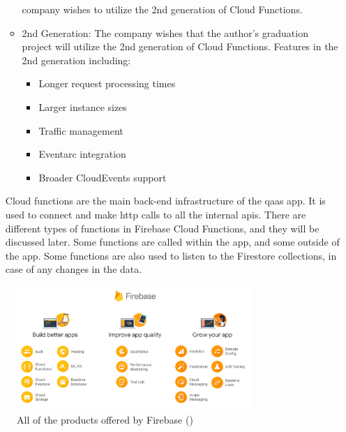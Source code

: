 \begin{itemize}
\begin{itemize}
                        company wishes to utilize the 2nd generation of Cloud Functions.
                  \item 2nd Generation: The company wishes that the author's graduation project will utilize the 2nd
                        generation of Cloud Functions. Features in the 2nd generation including:
                        \begin{itemize}
                              \item Longer request processing times
                              \item Larger instance sizes
                              \item Traffic management
                              \item Eventarc integration
                              \item Broader CloudEvents support
                        \end{itemize}
            \end{itemize}
            Cloud functions are the main back-end infrastructure of the \acrshort{qaas} app. It is used to connect
            and make \acrshort{http} calls to all the internal \acrshort{api}s. There are different types of
            functions in Firebase Cloud Functions, and they will be discussed later. Some functions are called within
            the app, and some outside of the app. Some functions are also used to listen to the Firestore collections,
            in case of any changes in the data.
\end{itemize}

\begin{figure}[htbp]
      \centering
      \includegraphics[width=0.8\textwidth]{Figures/Firebase.png}
      \caption{All of the products offered by Firebase (\textit{\cite{firebasePic}})}
\end{figure}

